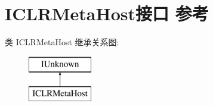 \hypertarget{interface_i_c_l_r_meta_host}{}\section{I\+C\+L\+R\+Meta\+Host接口 参考}
\label{interface_i_c_l_r_meta_host}
类 I\+C\+L\+R\+Meta\+Host 继承关系图\+:\begin{figure}[H]
\begin{center}
\leavevmode
\includegraphics[height=2.000000cm]{interface_i_c_l_r_meta_host}
\end{center}
\end{figure}
